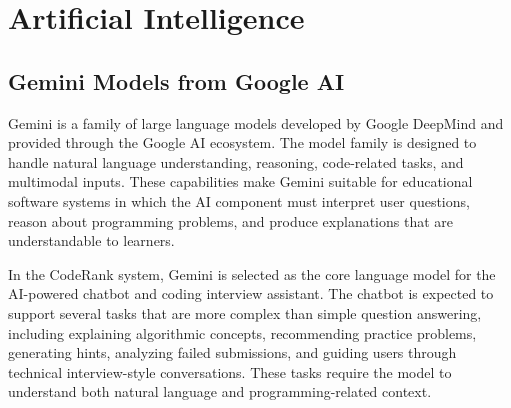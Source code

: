 \section{Artificial Intelligence}

\subsection{Gemini Models from Google AI}

Gemini is a family of large language models developed by Google DeepMind and provided through the Google AI ecosystem. The model family is designed to handle natural language understanding, reasoning, code-related tasks, and multimodal inputs. These capabilities make Gemini suitable for educational software systems in which the AI component must interpret user questions, reason about programming problems, and produce explanations that are understandable to learners.

In the CodeRank system, Gemini is selected as the core language model for the AI-powered chatbot and coding interview assistant. The chatbot is expected to support several tasks that are more complex than simple question answering, including explaining algorithmic concepts, recommending practice problems, generating hints, analyzing failed submissions, and guiding users through technical interview-style conversations. These tasks require the model to understand both natural language and programming-related context.

